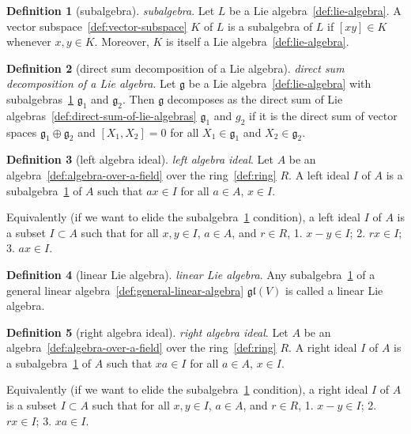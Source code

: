 \documentclass[12pt,a4paper]{article}
\theoremstyle{definition}
\newtheorem{definition}{Definition}
\begin{document}
\begin{definition}[subalgebra]\label{def:subalgebra}
\emph{subalgebra}. Let $L$ be a Lie algebra~\ref{def:lie-algebra}. A vector subspace~\ref{def:vector-subspace} $K$ of $L$ is a subalgebra of $L$ if $[xy] \in K$ whenever $x,y \in K$. Moreover, $K$ is itself a Lie algebra~\ref{def:lie-algebra}.
\end{definition}

\begin{definition}[direct sum decomposition of a Lie algebra]\label{def:direct-sum-decomposition-of-a-lie-algebra}
\emph{direct sum decomposition of a Lie algebra}. Let $\mathfrak g$ be a Lie algebra~\ref{def:lie-algebra} with subalgebras~\ref{def:subalgebra} $\mathfrak g_1$ and $\mathfrak g_2$. Then $\mathfrak g$ decomposes as the direct sum of Lie algebras~\ref{def:direct-sum-of-lie-algebras} $\mathfrak g_1$ and $g_2$ if it is the direct sum of vector spaces $\mathfrak g_1\oplus \mathfrak g_2$ and $[X_1,X_2]=0$ for all $X_1\in\mathfrak g_1$ and $X_2\in \mathfrak g_2$.
\end{definition}

\begin{definition}[left algebra ideal]\label{def:left-algebra-ideal}
\emph{left algebra ideal}. Let $A$ be an algebra~\ref{def:algebra-over-a-field} over the ring~\ref{def:ring} $R$. A left ideal $I$ of $A$ is a subalgebra~\ref{def:subalgebra} of $A$ such that $ax\in I$ for all $a\in A$, $x\in I$. 

Equivalently (if we want to elide the subalgebra~\ref{def:subalgebra} condition), a left ideal $I$ of $A$ is a subset $I\subset A$ such that for all $x,y\in I$, $a\in A$, and $r\in R$,
1. $x-y\in I$;
2. $rx\in I$;
3. $ax\in I$.
\end{definition}

\begin{definition}[linear Lie algebra]\label{def:linear-lie-algebra}
\emph{linear Lie algebra}. Any subalgebra~\ref{def:subalgebra} of a general linear algebra~\ref{def:general-linear-algebra} $\mathfrak{gl}(V)$ is called a linear Lie algebra.
\end{definition}

\begin{definition}[right algebra ideal]\label{def:right-algebra-ideal}
\emph{right algebra ideal}. Let $A$ be an algebra~\ref{def:algebra-over-a-field} over the ring~\ref{def:ring} $R$. A right ideal $I$ of $A$ is a subalgebra~\ref{def:subalgebra} of $A$ such that $xa\in I$ for all $a\in A$, $x\in I$. 

Equivalently (if we want to elide the subalgebra~\ref{def:subalgebra} condition), a right ideal $I$ of $A$ is a subset $I\subset A$ such that for all $x,y\in I$, $a\in A$, and $r\in R$,
1. $x-y\in I$;
2. $rx\in I$;
3. $xa\in I$.
\end{definition}
\end{document}
